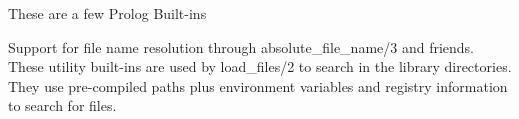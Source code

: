 These are a few Prolog Built-\/ins

Support for file name resolution through absolute\+\_\+file\+\_\+name/3 and friends. These utility built-\/ins are used by load\+\_\+files/2 to search in the library directories. They use pre-\/compiled paths plus environment variables and registry information to search for files. 